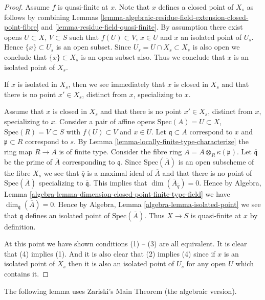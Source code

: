 \begin{proof}
Assume $f$ is quasi-finite at $x$.
Note that $x$ defines a closed point of $X_s$ as follows by combining
Lemmas \ref{lemma-algebraic-residue-field-extension-closed-point-fibre} and
\ref{lemma-residue-field-quasi-finite}.
By assumption there exist opens $U \subset X$, $V \subset S$ such
that $f(U) \subset V$, $x \in U$ and $x$ an isolated point
of $U_s$. Hence $\{x\} \subset U_s$ is an open subset.
Since $U_s = U \cap X_s \subset X_s$ is also open we conclude
that $\{x\} \subset X_s$ is an open subset also. Thus we conclude
that $x$ is an isolated point of $X_s$.

\medskip\noindent
If $x$ is isolated in $X_s$, then we see immediately that
$x$ is closed in $X_s$ and that there is no point $x' \in X_s$,
distinct from $x$, specializing to $x$.

\medskip\noindent
Assume that $x$ is closed in $X_s$ and that there is no point $x' \in X_s$,
distinct from $x$, specializing to $x$. Consider a pair of affine opens
$\text{Spec}(A) = U \subset X$, $\text{Spec}(R) = V \subset S$ with
$f(U) \subset V$ and $x \in U$. Let $\mathfrak q \subset A$ correspond to
$x$ and $\mathfrak p \subset R$ correspond to $s$.
By Lemma \ref{lemma-locally-finite-type-characterize} the ring map
$R \to A$ is of finite type. Consider the fibre ring
$\overline{A} = A \otimes_R \kappa(\mathfrak p)$.
Let $\overline{\mathfrak q}$ be the prime of $\overline{A}$ corresponding
to $\mathfrak q$. Since $\text{Spec}(\overline{A})$ is an open subscheme of
the fibre $X_s$ we see that $\overline{q}$ is a maximal ideal
of $\overline{A}$ and that there is no point of $\text{Spec}(\overline{A})$
specializing to $\overline{\mathfrak q}$.
This implies that $\dim(\overline{A}_{\overline{q}}) = 0$.
Hence by
Algebra, Lemma \ref{algebra-lemma-dimension-closed-point-finite-type-field}
we have $\dim_{\overline{\mathfrak q}}(\overline{A}) = 0$.
Hence by Algebra, Lemma \ref{algebra-lemma-isolated-point}
we see that $\mathfrak q$ defines an isolated point of
$\text{Spec}(\overline{A})$. Thus $X \to S$ is quasi-finite at
$x$ by definition.

\medskip\noindent
At this point we have shown conditions (1) -- (3) are all equivalent.
It is clear that (4) implies (1). And it is also clear that
(2) implies (4) since if $x$ is an isolated point of $X_s$
then it is also an isolated point of $U_s$ for any open $U$
which contains it.
\end{proof}

\noindent
The following lemma uses Zariski's Main Theorem (the algebraic version).

